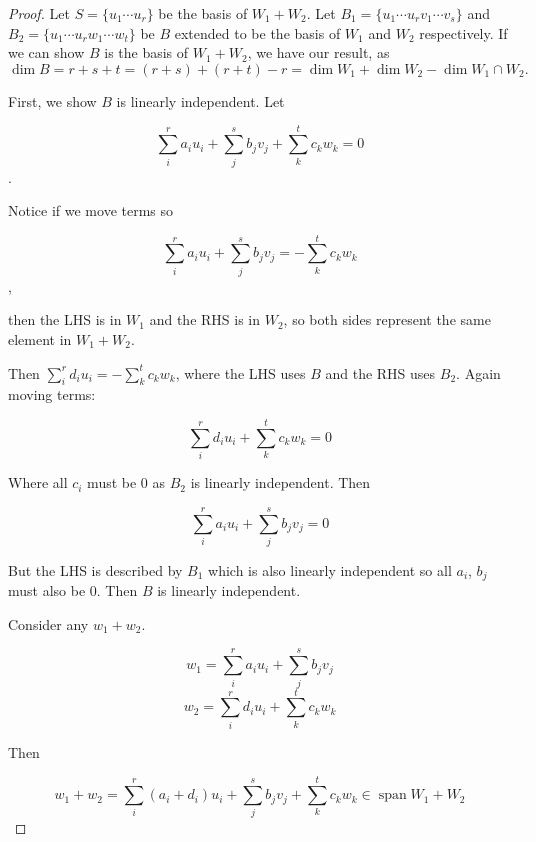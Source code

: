 \documentclass[10pt]{article}
\begin{document}
\begin{proof}
	Let $S = \{ u_1 \cdots u_r \}$ be the basis of $W_1 + W_2$. Let $B_1 = \{ u_1 \cdots u_r v_1 \cdots v_s \}$ and $B_2 = \{ u_1 \cdots u_r w_1 \cdots w_t \}$ be $B$ extended to be the basis of $W_1$ and $W_2$ respectively. 
	If we can show $B$ is the basis of $W_1 + W_2$, we have our result, as $\dim B = r + s + t = (r + s) + (r + t) - r = \dim W_1 + \dim W_2 - \dim W_1 \cap W_2.$

	First, we show $B$ is linearly independent. Let 

	\[\sum_i^r{a_iu_i} + \sum_j^s{b_jv_j} + \sum_k^t{c_kw_k} = 0\]. 

	Notice if we move terms so 

	\[\sum_i^r{a_iu_i} + \sum_j^s{b_jv_j} = -\sum_k^t{c_kw_k}\], 

	then the LHS is in $W_1$ and the RHS is in $W_2$, so both sides represent the same element in $W_1 + W_2$. 

	Then $\sum_i^r{d_iu_i} = -\sum_k^t{c_kw_k}$, where the LHS uses $B$ and the RHS uses $B_2$. Again moving terms:

	\[\sum_i^r{d_iu_i} + \sum_k^t{c_kw_k} = 0\]

	Where all $c_i$ must be 0 as $B_2$ is linearly independent. Then

	\[\sum_i^r{a_iu_i} + \sum_j^s{b_jv_j} = 0\]

	But the LHS is described by $B_1$ which is also linearly independent so all $a_i$, $b_j$ must also be 0. Then $B$ is linearly independent.

	Consider any $w_1 + w_2$. 

	\[w_1 = \sum_i^r{a_iu_i} + \sum_j^s{b_jv_j}\]
	\[w_2 = \sum_i^r{d_iu_i} + \sum_k^t{c_kw_k}\]

	Then

	\[w_1 + w_2 = \sum_i^r{(a_i + d_i) u_i} + \sum_j^s{b_jv_j} + \sum_k^t{c_kw_k} \in \operatorname{span} W_1 + W_2 \]

\end{proof}
\end{document}
